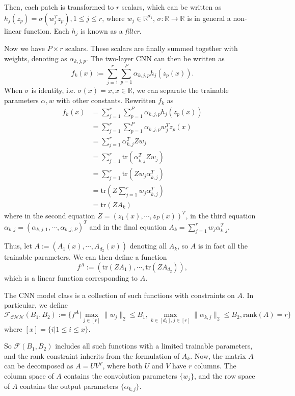 \documentclass{article}
\begin{document}
Then, each patch is transformed to $r$ scalars, which can be written as $h_j(z_p)=\sigma(w_j^Tz_p),1\leq j\leq r$, where $w_j\in\mathbb{R}^{d_1}$, $\sigma:\mathbb{R}\rightarrow\mathbb{R}$ is in general a non-linear function. Each $h_j$ is known as a \emph{filter}.

Now we have $P\times r$ scalars. These scalars are finally summed together with weights, denoting as $\alpha_{k,j,p}$. The two-layer CNN can then be written as
\[f_k(x):=\sum_{j=1}^{r}\sum_{p=1}^{P}\alpha_{k,j,p}h_j(z_p(x)).\]
When $\sigma$ is identity, i.e. $\sigma(x)=x,x\in\mathbb{R}$, we can separate the trainable parameters $\alpha,w$ with other constants. Rewritten $f_k$ as
\begin{align*}
f_k(x)&=\sum_{j=1}^{r}\sum_{p=1}^{P}\alpha_{k,j,p}h_j(z_p(x))\\
&=\sum_{j=1}^{r}\sum_{p=1}^{P}\alpha_{k,j,p}w_j^Tz_p(x)\\
&=\sum_{j=1}^{r}\alpha_{k,j}^TZw_j\\
&=\sum_{j=1}^{r}\text{tr}(\alpha_{k,j}^TZw_j)\\
&=\sum_{j=1}^{r}\text{tr}(Zw_j\alpha_{k,j}^T)\\
&=\text{tr}(Z\sum_{j=1}^{r}w_j\alpha_{k,j}^T)\\
&=\text{tr}(ZA_k)
\end{align*}
where in the second equation $Z=(z_1(x),\cdots,z_P(x))^T$, in the third equation $\alpha_{k,j}=(\alpha_{k,j,1},\cdots,\alpha_{k,j,P})^T$ and in the final equation $A_k=\sum_{j=1}^{r}w_j\alpha_{k,j}^T$.

Thus, let $A:=(A_1(x),\cdots,A_{d_2}(x))$ denoting all $A_k$, so $A$ is in fact all the trainable parameters. We can then define a function \[f^A:=(\text{tr}(ZA_1),\cdots,\text{tr}(ZA_{d_2})),\] which is a linear function corresponding to $A$.

The CNN model class is a collection of such functions with constraints on $A$. In particular, we define
\[\mathcal{F_{\text{CNN}}}(B_1,B_2):=\lbrace f^A|\max_{j\in[r]}\|w_j\|_2\leq B_1, \max_{k\in[d_2],j\in[r]}\|\alpha_{k,j}\|_2\leq B_2,\text{rank}(A)=r \rbrace\]
where $[x]=\lbrace i|1\leq i\leq x\rbrace.$

So $\mathcal{F}(B_1,B_2)$ includes all such functions with a limited trainable parameters, and the rank constraint inherits from the formulation of $A_k$. Now, the matrix $A$ can be decomposed as $A=UV^T$, where both $U$ and $V$ have $r$ columns. The column space of $A$ contains the convolution parameters $\lbrace w_j\rbrace$, and the row space of $A$ contains the output parameters $\lbrace\alpha_{k,j}\rbrace$.
\end{document}
